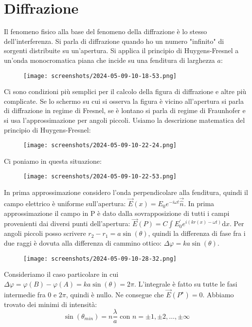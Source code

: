 \section{Diffrazione}
Il fenomeno fisico alla base del fenomeno della diffrazione è lo stesso dell'interferenza. Si parla di diffrazione quando ho un numero "infinito" di sorgenti distribuite su un'apertura. Si applica il principio di Huygens-Fresnel a un'onda monocromatica piana che incide su una fenditura di larghezza \(a\):
\begin{figure}[H]
	\centering
	\texttt{[image: screenshots/2024-05-09-10-18-53.png]}
\end{figure}
Ci sono condizioni più semplici per il calcolo della figura di diffrazione e altre più complicate. Se lo schermo su cui si osserva la figura è vicino all'apertura si parla di diffrazione in regime di Fresnel, se è lontano si parla di regime di Fraunhofer e si usa l'approssimazione per angoli piccoli. Usiamo la descrizione matematica del principio di Huygens-Fresnel:
\begin{figure}[H]
	\centering
	\texttt{[image: screenshots/2024-05-09-10-22-24.png]}
\end{figure}
Ci poniamo in questa situazione:
\begin{figure}[H]
	\centering
	\texttt{[image: screenshots/2024-05-09-10-22-53.png]}
\end{figure}
In prima approssimazione considero l'onda perpendicolare alla fenditura, quindi il campo elettrico è uniforme sull'apertura: \(\vec{E}(x)= E_0 e^{-i \omega t} \vec{\hat{n}}\). In prima approssimazione il campo in P è dato dalla sovrapposizione di tutti i campi provenienti dai diversi punti dell'apertura: \(\vec{E}(P)= C \int E_0^{\prime} e^{i(kr(x)- \omega t)}\mathrm{d} x\). Per angoli piccoli posso scrivere \(r_2 - r_1 = a \sin (\theta )\), quindi la differenza di fase fra i due raggi è dovuta alla differenza di cammino ottico: \(\Delta \varphi = ka \sin (\theta )\).
\begin{figure}[H]
	\centering
	\texttt{[image: screenshots/2024-05-09-10-28-32.png]}
\end{figure}
Consideriamo il caso particolare in cui \(\Delta \varphi = \varphi (B) - \varphi (A) = ka \sin (\theta ) = 2\pi \). L'integrale è fatto su tutte le fasi intermedie fra \(0\) e \(2\pi \), quindi è nullo. Ne consegue che \(\vec{E}(P^{\star} )=0\). Abbiamo trovato dei minimi di intensità:
\begin{equation}
	\sin (\theta_{min} )=n \frac{\lambda }{a} \text{ con } n= \pm 1, \pm 2, \dots, \pm \infty 
\end{equation}
